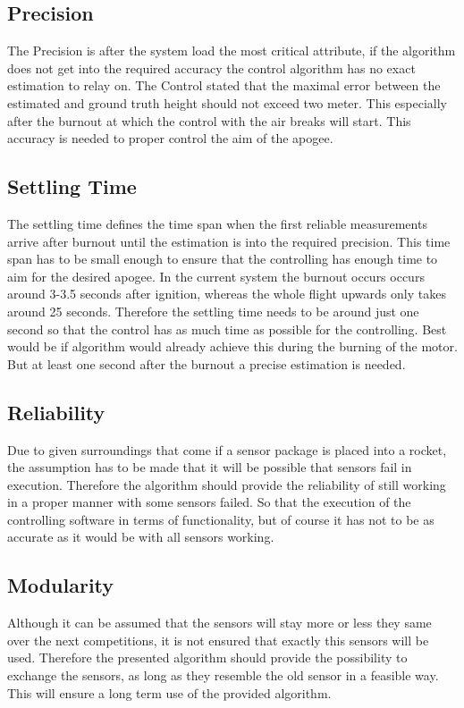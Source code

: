  \subsection{Precision}
 The Precision is after the system load the most critical attribute, if the algorithm does not get into the required accuracy the control algorithm has no exact estimation to relay on.
 The Control stated that the maximal error between the estimated and ground truth height should not exceed two meter. 
 This especially after the burnout at which the control with the air breaks will start.
 This accuracy is needed to proper control the aim of the apogee.
 
 \subsection{Settling Time}
 The settling time defines the time span when the first reliable measurements arrive after burnout until the estimation is into the required precision.
 This time span has to be small enough to ensure that the controlling has enough time to aim for the desired apogee. In the current system the burnout occurs 
 occurs around 3-3.5 seconds after ignition, whereas the whole flight upwards only takes around 25 seconds. Therefore the settling time needs to be around just
 one second so that the control has as much time as possible for the controlling. Best would be if algorithm would already achieve this during the burning of the motor.
 But at least one second after the burnout a precise estimation is needed.
 
 \subsection{Reliability}
 Due to given surroundings that come if a sensor package is placed into a rocket, the assumption has to be made that it will be possible that sensors fail in execution.
 Therefore the algorithm should provide the reliability of still working in a proper manner with some sensors failed. So that the execution of the controlling software
 in terms of functionality, but of course it has not to be as accurate as it would be with all sensors working.

 \subsection{Modularity}
 Although it can be assumed that the sensors will stay more or less they same over the next competitions, it is not ensured that exactly this sensors will be used.
 Therefore the presented algorithm should provide the possibility to exchange the sensors, as long as they resemble the old sensor in a feasible way.
 This will ensure a long term use of the provided algorithm.
 
